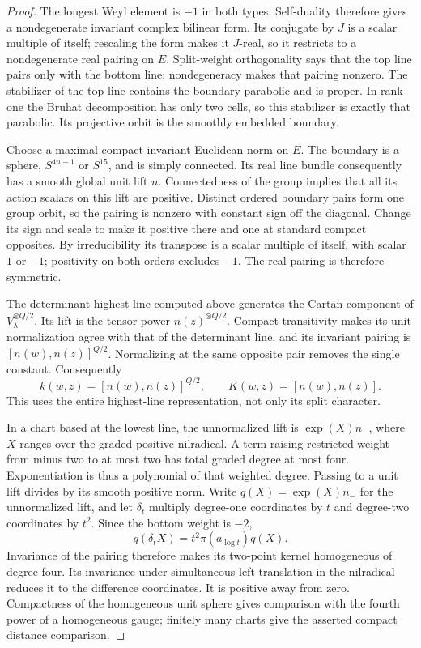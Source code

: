 \begin{proof}
The longest Weyl element is $-1$ in both types. Self-duality therefore
gives a nondegenerate invariant complex bilinear form. Its conjugate by
$J$ is a scalar multiple of itself; rescaling the form makes it $J$-real,
so it restricts to a nondegenerate real pairing on $E$. Split-weight
orthogonality says that the top line pairs only with the bottom line;
nondegeneracy makes that pairing nonzero. The stabilizer of the top line
contains the boundary parabolic and is proper. In rank one the Bruhat
decomposition has only two cells, so this stabilizer is exactly that
parabolic. Its projective orbit is the smoothly embedded boundary.

Choose a maximal-compact-invariant Euclidean norm on $E$. The boundary
is a sphere, $S^{4n-1}$ or $S^{15}$, and is simply connected. Its real
line bundle consequently has a smooth global unit lift $n$. Connectedness
of the group implies that all its action scalars on this lift are positive.
Distinct ordered boundary pairs form one group orbit, so the pairing is
nonzero with constant sign off the diagonal. Change its sign and scale
to make it positive there and one at standard compact opposites. By
irreducibility its transpose is a scalar multiple of itself, with scalar
$1$ or $-1$; positivity on both orders excludes $-1$. The real pairing
is therefore symmetric.

The determinant highest line computed above generates the Cartan
component of $V_\lambda^{\otimes Q/2}$. Its lift is the tensor power
$n(z)^{\otimes Q/2}$. Compact transitivity makes its unit normalization
agree with that of the determinant line, and its invariant pairing is
$[n(w),n(z)]^{Q/2}$. Normalizing at the same opposite pair removes the
single constant. Consequently
\[
 k(w,z)=[n(w),n(z)]^{Q/2},\qquad
 K(w,z)=[n(w),n(z)].
\]
This uses the entire highest-line representation, not only its split
character.

In a chart based at the lowest line, the unnormalized lift is
$\exp(X)n_-$, where $X$ ranges over the graded positive nilradical.
A term raising restricted weight from minus two to at most two has
total graded degree at most four.  Exponentiation is thus a
polynomial of that weighted degree.  Passing to a unit lift divides
by its smooth positive norm.  Write $q(X)=\exp(X)n_-$ for the unnormalized lift, and let
$\delta_t$ multiply degree-one coordinates by $t$ and degree-two
coordinates by $t^2$. Since the bottom weight is $-2$,
\[
 q(\delta_t X)=t^2\pi(a_{\log t})q(X).
\]
Invariance of the pairing therefore makes its two-point kernel
homogeneous of degree four. Its invariance under simultaneous left
translation in the nilradical reduces it to the difference coordinates.  It is
positive away from zero.  Compactness of the homogeneous unit sphere
gives comparison with the fourth power of a homogeneous gauge;
finitely many charts give the asserted compact distance comparison.


\end{proof}
